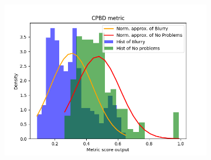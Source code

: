 \begin{figure}[H]
\begin{subfigure}[t]{0.48\textwidth}
        \caption{}
        \label{fig:CPBD_thresh}
    \end{subfigure}\hspace{1em}
    \begin{subfigure}[t]{0.48\textwidth}
        \includegraphics[width=\textwidth]{Figures/results_on_thresholds/output_dens_cpbd.png}
        \caption{}
        \label{fig:CPBD_dens}
    \end{subfigure}\hspace{1em}
    \caption{}
    \label{fig:CPBD_final}
\end{figure}

